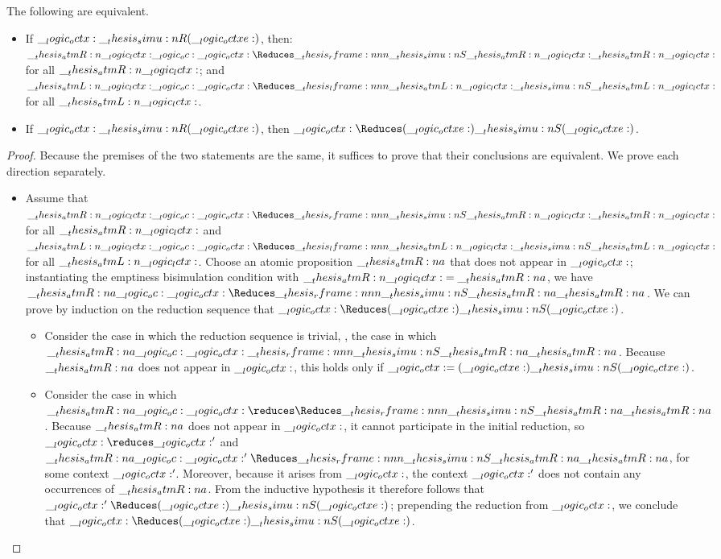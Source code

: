 \begin{theorem}\label{thm:emptiness-bisim-equiv}
  The following are equivalent.
  \begin{itemize}
  \item
    If $\__logic_octx: \__thesis_simu:n {R} (\__logic_octxe:)$, then: $\atmR{\lctx} \oc \octx \Reduces\rframe{\simu{S}}{\atmR{\lctx}} \atmR{\lctx}$ for all $\__thesis_atmR:n {\__logic_lctx:}$; and $\atmL{\lctx} \oc \octx \Reduces\lframe{\atmL{\lctx}}{\simu{S}} \atmL{\lctx}$ for all $\__thesis_atmL:n {\__logic_lctx:}$.
  \item
    If $\__logic_octx: \__thesis_simu:n {R} (\__logic_octxe:)$, then $\octx \Reduces (\octxe) \simu{S} (\octxe)$.
  \end{itemize}
\end{theorem}
\begin{proof}
  Because the premises of the two statements are the same, it suffices to prove that their conclusions are equivalent.
  We prove each direction separately.
  \begin{itemize}
  \item 
  Assume that $\atmR{\lctx} \oc \octx \Reduces\rframe{\simu{S}}{\atmR{\lctx}} \atmR{\lctx}$ for all $\__thesis_atmR:n {\__logic_lctx:}$ and $\atmL{\lctx} \oc \octx \Reduces\lframe{\atmL{\lctx}}{\simu{S}} \atmL{\lctx}$ for all $\__thesis_atmL:n {\__logic_lctx:}$.
  Choose an atomic proposition $\__thesis_atmR:n {a}$ that does not appear in $\__logic_octx:$; instantiating the emptiness bisimulation condition with $\__thesis_atmR:n {\__logic_lctx:} = \__thesis_atmR:n {a}$, we have $\atmR{a} \oc \octx \Reduces\rframe{\simu{S}}{\atmR{a}} \atmR{a}$.
  We can prove by induction on the reduction sequence that $\octx \Reduces (\octxe) \simu{S} (\octxe)$.
  \begin{itemize}
  \item
    Consider the case in which the reduction sequence is trivial, \ie, the case in which $\atmR{a} \oc \octx \rframe{\simu{S}}{\atmR{a}} \atmR{a}$.
    Because $\__thesis_atmR:n {a}$ does not appear in $\__logic_octx:$, this holds only if $\__logic_octx: = (\__logic_octxe:) \__thesis_simu:n {S} (\__logic_octxe:)$.

  \item
    Consider the case in which $\atmR{a} \oc \octx \reduces\Reduces\rframe{\simu{S}}{\atmR{a}} \atmR{a}$.
    Because $\__thesis_atmR:n {a}$ does not appear in $\__logic_octx:$, it cannot participate in the initial reduction, so $\octx \reduces \octx'$ and $\atmR{a} \oc \octx' \Reduces\rframe{\simu{S}}{\atmR{a}} \atmR{a}$, for some context $\__logic_octx:'$.
    Moreover, because it arises from $\__logic_octx:$, the context $\__logic_octx:'$ does not contain any occurrences of $\__thesis_atmR:n {a}$.
    From the inductive hypothesis it therefore follows that $\octx' \Reduces (\octxe) \simu{S} (\octxe)$;
    prepending the reduction from $\__logic_octx:$, we conclude that $\octx \Reduces (\octxe) \simu{S} (\octxe)$.
  \end{itemize}


\end{itemize}
\end{proof}
